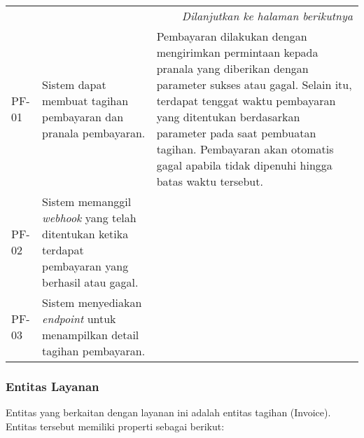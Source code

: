 \begin{longtable}{|l|p{}|p{}|}
    \hline
    \multicolumn{3}{|r|}{\textit{Dilanjutkan ke halaman berikutnya}}                                                                                                                                                                                                                                                                                                                                                                                      \\
    \endfoot

    \hline
    \endlastfoot

    \hline
    PF-01       & Sistem dapat membuat tagihan pembayaran dan pranala pembayaran.                                              & Pembayaran dilakukan dengan mengirimkan permintaan kepada pranala yang diberikan dengan parameter sukses atau gagal. Selain itu, terdapat tenggat waktu pembayaran yang ditentukan berdasarkan parameter pada saat pembuatan tagihan. Pembayaran akan otomatis gagal apabila tidak dipenuhi hingga batas waktu tersebut. \\
    \hline
    PF-02       & Sistem memanggil \textit{webhook} yang telah ditentukan ketika terdapat pembayaran yang berhasil atau gagal. &                                                                                                                                                                                                                                                                                                                          \\
    \hline
    PF-03       & Sistem menyediakan \textit{endpoint} untuk menampilkan detail tagihan pembayaran.                            &                                                                                                                                                                                                                                                                                                                          \\
\end{longtable}
\endgroup

\subsubsection{Entitas Layanan}

Entitas yang berkaitan dengan layanan ini adalah entitas tagihan (Invoice). Entitas tersebut memiliki properti sebagai berikut:

